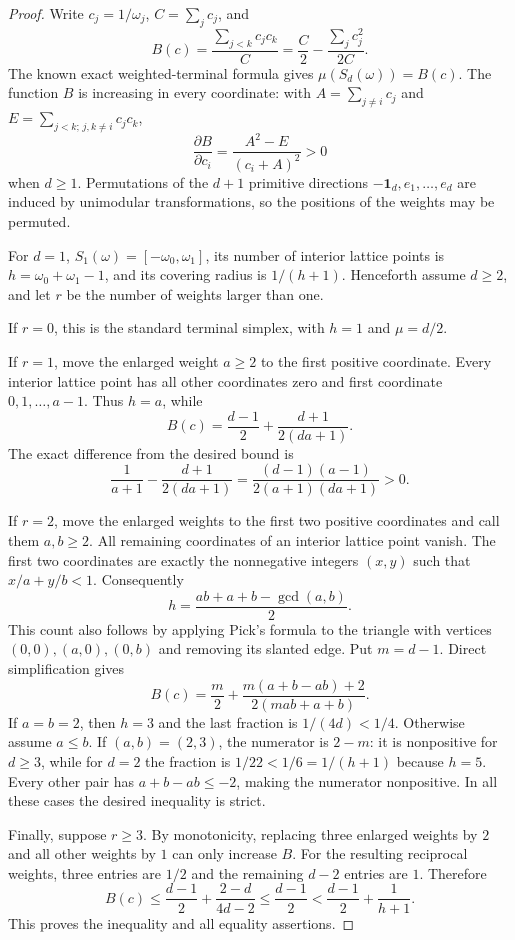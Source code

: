 \documentclass[11pt,a4paper]{article}
\theoremstyle{remark}\newtheorem{remark}[theorem]{Remark}
\begin{document}
\begin{proof}
Write $c_j=1/\omega_j$, $C=\sum_jc_j$, and
\[
 B(c)=\frac{\sum_{j<k}c_jc_k}{C}
 =\frac C2-\frac{\sum_jc_j^2}{2C}.
\]
The known exact weighted-terminal formula gives $\mu(S_d(\omega))=B(c)$.
The function $B$ is increasing in every coordinate: with
$A=\sum_{j\ne i}c_j$ and $E=\sum_{j<k;\,j,k\ne i}c_jc_k$,
\[
 \frac{\partial B}{\partial c_i}
 =\frac{A^2-E}{(c_i+A)^2}>0
\]
when $d\ge1$. Permutations of the $d+1$ primitive directions
$-\mathbf1_d,e_1,\ldots,e_d$ are induced by unimodular transformations,
so the positions of the weights may be permuted.

For $d=1$, $S_1(\omega)=[-\omega_0,\omega_1]$, its number of interior
lattice points is $h=\omega_0+\omega_1-1$, and its covering radius is
$1/(h+1)$.  Henceforth assume $d\ge2$, and let $r$ be the number of
weights larger than one.

If $r=0$, this is the standard terminal simplex, with $h=1$ and
$\mu=d/2$.

If $r=1$, move the enlarged weight $a\ge2$ to the first positive
coordinate. Every interior lattice point has all other coordinates
zero and first coordinate $0,1,\ldots,a-1$. Thus $h=a$, while
\[
 B(c)=\frac{d-1}{2}+\frac{d+1}{2(da+1)}.
\]
The exact difference from the desired bound is
\[
 \frac1{a+1}-\frac{d+1}{2(da+1)}
 =\frac{(d-1)(a-1)}{2(a+1)(da+1)}>0.
\]

If $r=2$, move the enlarged weights to the first two positive
coordinates and call them $a,b\ge2$. All remaining coordinates of an
interior lattice point vanish. The first two coordinates are exactly
the nonnegative integers $(x,y)$ such that $x/a+y/b<1$. Consequently
\[
 h=\frac{ab+a+b-\gcd(a,b)}2.
\]
This count also follows by applying Pick's formula to the triangle
with vertices $(0,0),(a,0),(0,b)$ and removing its slanted edge.
Put $m=d-1$. Direct simplification gives
\[
 B(c)=\frac m2+
 \frac{m(a+b-ab)+2}{2(mab+a+b)}.
\]
If $a=b=2$, then $h=3$ and the last fraction is $1/(4d)<1/4$.
Otherwise assume $a\le b$. If $(a,b)=(2,3)$, the numerator is $2-m$:
it is nonpositive for $d\ge3$, while for $d=2$ the fraction is
$1/22<1/6=1/(h+1)$ because $h=5$.
Every other pair has $a+b-ab\le-2$, making the numerator nonpositive.
In all these cases the desired inequality is strict.

Finally, suppose $r\ge3$. By monotonicity, replacing three enlarged
weights by $2$ and all other weights by $1$ can only increase $B$.
For the resulting reciprocal weights, three entries are $1/2$ and
the remaining $d-2$ entries are $1$. Therefore
\[
 B(c)\le
 \frac{d-1}{2}+\frac{2-d}{4d-2}
 \le\frac{d-1}{2}
 <\frac{d-1}{2}+\frac1{h+1}.
\]
This proves the inequality and all equality assertions.
\end{proof}
\end{document}
